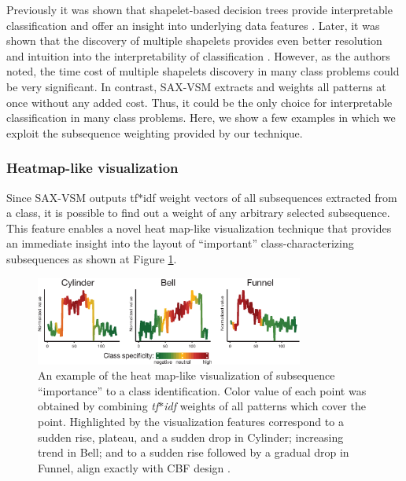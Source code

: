 \documentclass[conference]{IEEEtran}
\begin{document}
Previously it was shown that shapelet-based decision trees provide interpretable 
classification and offer an insight into underlying data features \cite{shapelet}. 
Later, it was shown that the discovery of multiple shapelets provides even 
better resolution and intuition into the interpretability of classification \cite{bagnal}. 
However, as the authors noted, the time cost of multiple shapelets discovery
in many class problems could be very significant. 
In contrast, SAX-VSM extracts and weights all patterns at once without
any added cost. Thus, it could be the only choice for interpretable classification 
in many class problems. 
Here, we show a few examples in which we exploit the subsequence weighting 
provided by our technique.

\subsubsection{Heatmap-like visualization}
Since SAX-VSM outputs tf$\ast$idf weight vectors of all subsequences extracted from a
class, it is possible to find out a weight of any arbitrary selected subsequence.
This feature enables a novel heat map-like visualization technique that provides an immediate
insight into the layout of ``important'' class-characterizing subsequences 
as shown at Figure \ref{fig:heat}.

\begin{figure}[t]
   \centering
   \vspace{0.1cm}
   \includegraphics[width=88mm]{figures/CBF-HEAT.eps}
   \caption{An example of the heat map-like visualization of subsequence ``importance''
   to a class identification. Color value of each point was obtained by combining 
   \textit{tf$\ast$idf} weights of all patterns which cover the point.
   Highlighted by the visualization features correspond to a sudden rise, plateau, 
   and a sudden drop in Cylinder; increasing trend in Bell; and to a sudden rise 
   followed by a gradual drop in Funnel, align exactly with CBF design \cite{cbf}.}
   \label{fig:heat}
   \vspace{-0.15cm}
\end{figure}
\end{document}
